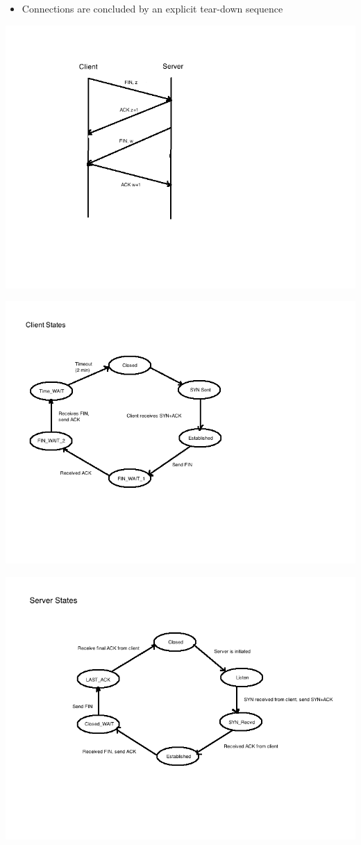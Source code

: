 \documentclass[11pt]{article}
\begin{document}
\begin{itemize}
\item Connections are concluded by an explicit tear-down sequence
\end{itemize}

\includegraphics[width=.9\linewidth]{diagrams/teardown.png}

\includegraphics[width=.9\linewidth]{diagrams/clientstates.png}

\includegraphics[width=.9\linewidth]{diagrams/serverstates.png}
\end{document}
